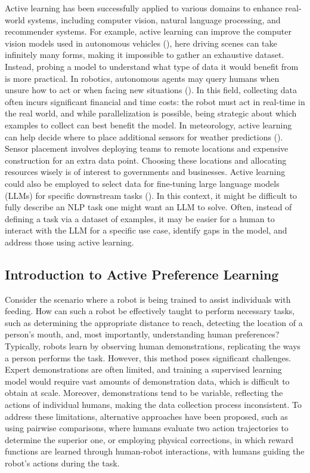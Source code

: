 \documentclass[
  letterpaper,
  numbers=noenddot,
  DIV=11]{scrreprt}
\theoremstyle{definition}
\theoremstyle{plain}
\theoremstyle{plain}
\theoremstyle{remark}
\begin{document}
Active learning has been successfully applied to various domains to
enhance real-world systems, including computer vision, natural language
processing, and recommender systems. For example, active learning can
improve the computer vision models used in autonomous vehicles
(), here driving
scenes can take infinitely many forms, making it impossible to gather an
exhaustive dataset. Instead, probing a model to understand what type of
data it would benefit from is more practical. In robotics, autonomous
agents may query humans when unsure how to act or when facing new
situations (). In this field, collecting data often incurs significant
financial and time costs: the robot must act in real-time in the real
world, and while parallelization is possible, being strategic about
which examples to collect can best benefit the model. In meteorology,
active learning can help decide where to place additional sensors for
weather predictions (). Sensor placement involves deploying teams to remote
locations and expensive construction for an extra data point. Choosing
these locations and allocating resources wisely is of interest to
governments and businesses. Active learning could also be employed to
select data for fine-tuning large language models (LLMs) for specific
downstream tasks (). In
this context, it might be difficult to fully describe an NLP task one
might want an LLM to solve. Often, instead of defining a task via a
dataset of examples, it may be easier for a human to interact with the
LLM for a specific use case, identify gaps in the model, and address
those using active learning.

\subsection{Introduction to Active Preference
Learning}\label{introduction-to-active-preference-learning}

Consider the scenario where a robot is being trained to assist
individuals with feeding. How can such a robot be effectively taught to
perform necessary tasks, such as determining the appropriate distance to
reach, detecting the location of a person's mouth, and, most
importantly, understanding human preferences? Typically, robots learn by
observing human demonstrations, replicating the ways a person performs
the task. However, this method poses significant challenges. Expert
demonstrations are often limited, and training a supervised learning
model would require vast amounts of demonstration data, which is
difficult to obtain at scale. Moreover, demonstrations tend to be
variable, reflecting the actions of individual humans, making the data
collection process inconsistent. To address these limitations,
alternative approaches have been proposed, such as using pairwise
comparisons, where humans evaluate two action trajectories to determine
the superior one, or employing physical corrections, in which reward
functions are learned through human-robot interactions, with humans
guiding the robot's actions during the task.
\end{document}
